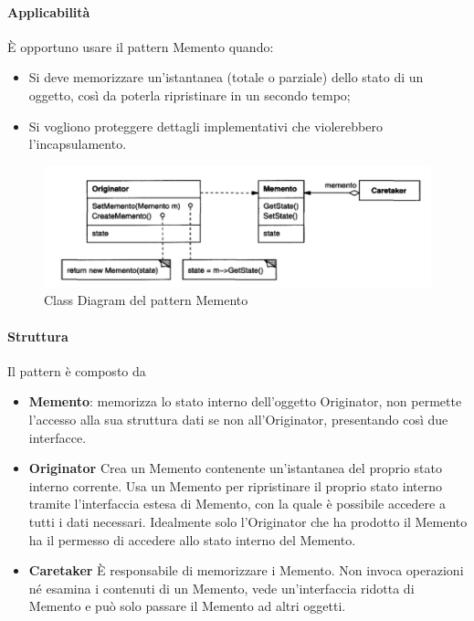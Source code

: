 \newpage

\paragraph{Applicabilità} È opportuno usare il pattern Memento quando:
\begin{itemize}
    \item Si deve memorizzare un'istantanea (totale o parziale) dello stato di un oggetto, così da poterla ripristinare in un secondo tempo;
    \item Si vogliono proteggere dettagli implementativi che violerebbero l'incapsulamento.
\end{itemize}

\begin{figure}[H]
    \centering
    \includegraphics[width=1\linewidth]{assets/pattern/memento/memento-struttura.png}
    \caption{Class Diagram del pattern Memento}
\end{figure}

\paragraph{Struttura} Il pattern è composto da
\begin{itemize}
    \item \textbf{Memento}: memorizza lo stato interno dell’oggetto Originator, non permette l’accesso alla sua struttura dati se non all’Originator, presentando così due interfacce.
    \item \textbf{Originator} Crea un Memento contenente un’istantanea del proprio stato interno corrente. Usa un Memento per ripristinare il proprio stato interno tramite l’interfaccia estesa di Memento, con la quale è possibile accedere a tutti i dati necessari. Idealmente solo l’Originator che ha prodotto il Memento ha il permesso di accedere allo stato interno del Memento. 
    \item \textbf{Caretaker} È responsabile di memorizzare i Memento. Non invoca operazioni né esamina i contenuti di un Memento, vede un’interfaccia ridotta di Memento e può solo passare il Memento ad altri oggetti.
\end{itemize}


